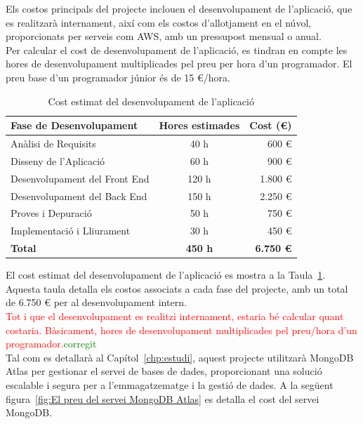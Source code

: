 \documentclass[a4paper,12pt,twoside]{ThesisStyle}
\newcommand{\pau}[1]{\textcolor{red}{#1}}
\newcommand{\sudan}[1]{\textcolor{green}{#1}}
\begin{document}
Els costos principals del projecte inclouen el desenvolupament de l'aplicació, que es realitzarà internament, així com els costos d'allotjament en el núvol, proporcionats per serveis com AWS, amb un pressupost mensual o anual.\\

Per calcular el cost de desenvolupament de l’aplicació, es tindran en compte les hores de desenvolupament multiplicades pel preu per hora d'un programador. El preu base d'un programador júnior és de 15 €/hora.

\begin{table}[h!]
    \centering
    \begin{tabular}{|l|c|r|}
    \hline
    \textbf{Fase de Desenvolupament} & \textbf{Hores estimades} & \textbf{Cost (€)} \\ \hline
    Anàlisi de Requisits       & 40 h  & 600 € \\ \hline
    Disseny de l'Aplicació     & 60 h  & 900 € \\ \hline
    Desenvolupament del Front End & 120 h & 1.800 € \\ \hline
    Desenvolupament del Back End  & 150 h & 2.250 € \\ \hline
    Proves i Depuració         & 50 h  & 750 € \\ \hline
    Implementació i Lliurament & 30 h  & 450 €  \\ \hline
    \textbf{Total}             & \textbf{450 h} & \textbf{6.750 €}  \\ \hline
    \end{tabular}
    \caption{Cost estimat del desenvolupament de l'aplicació}
    \label{tab:costos_desenvolupament}
\end{table}


El cost estimat del desenvolupament de l'aplicació es mostra a la Taula~\ref{tab:costos_desenvolupament}. Aquesta taula detalla els costos associats a cada fase del projecte, amb un total de 6.750 € per al desenvolupament intern.\\


\pau{Tot i que el desenvolupament es realitzi internament, estaria bé calcular quant costaria. Bàsicament, hores de desenvolupament multiplicades pel preu/hora d'un programador.}\sudan{corregit}\\

Tal com es detallarà al Capítol~\ref{chp:estudi}, aquest projecte utilitzarà MongoDB Atlas per gestionar el servei de bases de dades, proporcionant una solució escalable i segura per a l'emmagatzematge i la gestió de dades. A la següent figura~\ref{fig:El preu del servei MongoDB Atlas} es detalla el cost del servei MongoDB.
\end{document}
